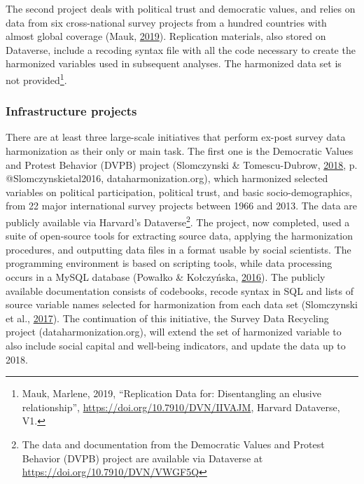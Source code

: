 \documentclass[12pt,]{article}
\let\rmarkdownfootnote\footnote%
\def\footnote{\protect\rmarkdownfootnote}
\begin{document}
The second project deals with political trust and democratic values, and relies on data from six cross-national survey projects from a hundred countries with almost global coverage (Mauk, \protect\hyperlink{ref-Mauk2019}{2019}). Replication materials, also stored on Dataverse, include a recoding syntax file with all the code necessary to create the harmonized variables used in subsequent analyses. The harmonized data set is not provided\footnote{Mauk, Marlene, 2019, ``Replication Data for: Disentangling an elusive relationship'', \url{https://doi.org/10.7910/DVN/IIVAJM}, Harvard Dataverse, V1.}.

\hypertarget{infrastructure-projects}{%
\subsubsection{Infrastructure projects}\label{infrastructure-projects}}

There are at least three large-scale initiatives that perform ex-post survey data harmonization as their only or main task. The first one is the Democratic Values and Protest Behavior (DVPB) project (Slomczynski \& Tomescu-Dubrow, \protect\hyperlink{ref-Slomczynski2018}{2018}, p. @Slomczynskietal2016, dataharmonization.org), which harmonized selected variables on political participation, political trust, and basic socio-demographics, from 22 major international survey projects between 1966 and 2013. The data are publicly available via Harvard's Dataverse\footnote{The data and documentation from the Democratic Values and Protest Behavior (DVPB) project are available via Dataverse at \url{https://doi.org/10.7910/DVN/VWGF5Q}}.
The project, now completed, used a suite of open-source tools for extracting source data, applying the harmonization procedures, and outputting data files in a format usable by social scientists. The programming environment is based on scripting tools, while data processing occurs in a MySQL database (Powałko \& Kołczyńska, \protect\hyperlink{ref-Powako2016}{2016}). The publicly available documentation consists of codebooks, recode syntax in SQL and lists of source variable names selected for harmonization from each data set (Slomczynski et al., \protect\hyperlink{ref-Slomczynskietal2017}{2017}). The continuation of this initiative, the Survey Data Recycling project (dataharmonization.org), will extend the set of harmonized variable to also include social capital and well-being indicators, and update the data up to 2018.
\end{document}
